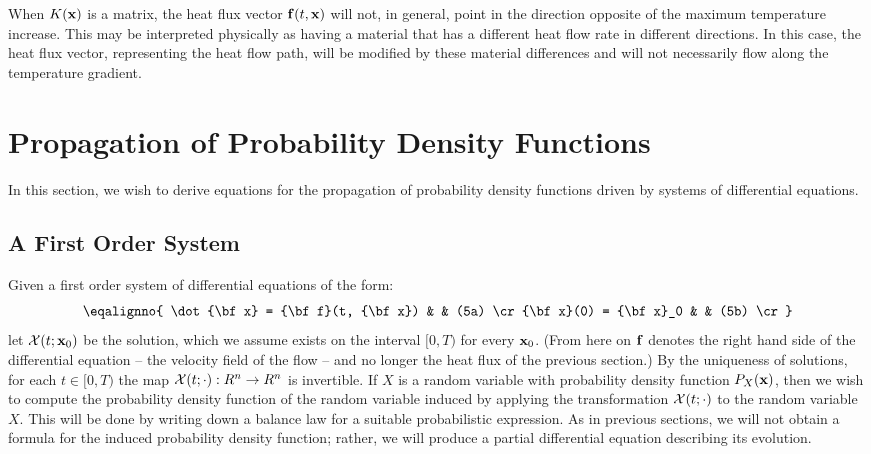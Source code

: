 When $K({\bf x})$ is a matrix, the heat flux vector ${\bf f}(t,{\bf x})$ will not,
in general, point in the direction opposite of the maximum 
temperature increase. This may be interpreted physically as having a material
that has a different heat flow rate in different directions. In this case,
the heat flux vector, representing the heat flow path, will be modified 
by these material differences and will not necessarily flow along 
the temperature gradient.


\section{Propagation of Probability Density Functions}
In this section, we wish to derive equations for the propagation of 
probability density functions driven by systems of differential equations.

\subsection{A First Order System}
Given a first order system of differential equations of the form:
$$
\eqalignno{
\dot {\bf x} =  {\bf f}(t, {\bf x}) & & (5a) \cr
{\bf x}(0) = {\bf x}_0  & & (5b) \cr }
$$
let ${\cal X}(t; {\bf x}_0)$ be the solution, 
which we assume exists on the interval $[0,T)$ for every ${\bf x}_0$.
(From here on ${\bf f}$ denotes the right hand side of the differential
equation -- the velocity field of the flow -- and no longer the heat flux
of the previous section.)
By the uniqueness of solutions, for each $t \in [0,T)$ the map
${\cal X}(t; \cdot): R^n \to R^n$ is invertible. If $X$ is a random variable with 
probability density function $P_X({\bf x})$, then we wish to compute 
the probability density function of the random variable induced by 
applying the transformation
${\cal X}(t; \cdot)$ to the random variable $X$.
This will be done by writing down a balance law for a 
suitable probabilistic expression. As in previous sections, we will not 
obtain a formula for the induced probability density function; rather, 
we will produce a partial differential equation describing its evolution.

